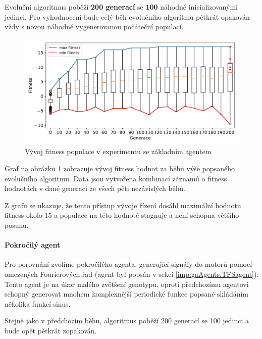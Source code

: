 Evoluční algoritmus poběží \textbf{200 generací} se \textbf{100} náhodně
inicializovanými jedinci. Pro vyhodnocení bude celý běh evolučního algoritmu
pětkrát opakován vždy s novou náhodně vygenerovanou počáteční populací.

\begin{figure}[!h]
    \centering
    \includegraphics[width=1\textwidth]{../img/experiment1_Sine_10ticks.pdf}
    \caption{Vývoj fitness populace v experimentu se základním agentem}
    \label{exp:first_sinefull}
\end{figure}

Graf na obrázku \ref{exp:first_sinefull} zobrazuje vývoj fitness
hodnot za běhu výše popsaného evolučního algoritmu. Data jsou vytvořena
kombinací záznamů o fitness hodnotách v dané generaci ze všech pěti nezávislých
běhů.

Z grafu se ukazuje, že tento přístup vývoje řízení dosáhl maximální hodnotu
fitness okolo 15 a populace na této hodnotě stagnuje a není schopna většího
posunu.

\paragraph{Pokročilý agent}
Pro porovnání zvolíme pokročilého agenta, generující signály do motorů pomocí
omezených Fourierových řad (agent byl popsán v sekci
\ref{imp:gaAgents.TFSagent}). Tento agent je na úkor malého zvětšení genotypu,
oproti předchozímu agentovi schopný generovat mnohem komplexnější periodické
funkce popsané skládáním několika funkcí sinus.

Stejně jako v předchozím běhu, algoritmus poběží 200 generací se 100 jedinci a
bude opět pětkrát zopakován.

